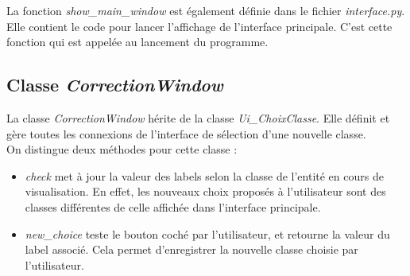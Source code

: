 La fonction \textit{show\_main\_window} est également définie dans le fichier \textit{interface.py}. Elle contient le code pour lancer l'affichage de l'interface principale. C'est cette fonction qui est appelée au lancement du programme.

\subsection{Classe \textit{CorrectionWindow}}

La classe \textit{CorrectionWindow} hérite de la classe \textit{Ui\_ChoixClasse}. Elle définit et gère toutes les connexions de l'interface de sélection d'une nouvelle classe.\\

\noindent On distingue deux méthodes pour cette classe :
\begin{itemize} [label=$\rightarrow$]
	\item \textit{check} met à jour la valeur des labels selon la classe de l'entité en cours de visualisation. En effet, les nouveaux choix proposés à l'utilisateur sont des classes différentes de celle affichée dans l'interface principale.
	\item \textit{new\_choice} teste le bouton coché par l'utilisateur, et retourne la valeur du label associé. Cela permet d'enregistrer la nouvelle classe choisie par l'utilisateur.
\end{itemize}

